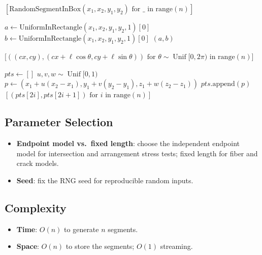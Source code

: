 \begin{algorithm}
\caption{Random Line Segment Generation}\label{alg:random_segments}
\begin{algorithmic}
    \State \Return $[\text{RandomSegmentInBox}(x_1, x_2, y_1, y_2) \text{ for } \_ \text{ in range}(n)]$
\EndFunction

\Statex

    \State $a \gets \text{UniformInRectangle}(x_1, x_2, y_1, y_2, 1)[0]$
    \State $b \gets \text{UniformInRectangle}(x_1, x_2, y_1, y_2, 1)[0]$
    \State \Return $(a, b)$
\EndFunction

\Statex

    \State \Return $\big[( (cx, cy), (cx + \ell \cos \theta, cy + \ell \sin \theta) ) \text{ for } \theta \sim \operatorname{Unif}[0, 2\pi) \text{ in range}(n)\big]$
\EndFunction

\Statex

    \State $pts \gets []$
        \State $u, v, w \sim \operatorname{Unif}[0, 1)$
        \State $p \gets (x_1 + u(x_2 - x_1), y_1 + v(y_2 - y_1), z_1 + w(z_2 - z_1))$
        \State $pts.\text{append}(p)$
    \EndWhile
    \State \Return $[(pts[2i], pts[2i+1]) \text{ for } i \text{ in range}(n)]$
\EndFunction
\end{algorithmic}
\end{algorithm}

\subsection{Parameter Selection}
\begin{itemize}
    \item \textbf{Endpoint model vs.\ fixed length}: choose the independent
      endpoint model for intersection and arrangement stress tests; fixed
      length for fiber and crack models.
    \item \textbf{Seed}: fix the RNG seed for reproducible random inputs.
\end{itemize}

\subsection{Complexity}
\begin{itemize}
    \item \textbf{Time}: $O(n)$ to generate $n$ segments.
    \item \textbf{Space}: $O(n)$ to store the segments; $O(1)$ streaming.
\end{itemize}

